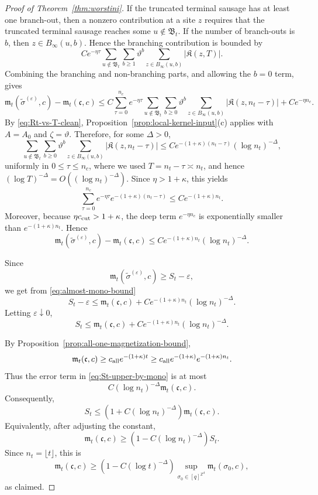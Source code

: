 \documentclass[letterpaper,11pt,reqno]{amsart}
\theoremstyle{definition}
\newcommand{\IK}{\mathfrak{K}}
\begin{document}
\begin{proof}[Proof of Theorem~\ref{thm:worstini}]
If the truncated terminal sausage has at least one branch-out, then a nonzero contribution at a
site \(z\) requires that the truncated terminal sausage reaches some
\(u\notin\mathfrak B_t\). If the number of branch-outs is \(b\), then
\(z\in B_\infty(u,b)\). Hence the branching contribution is bounded by
\[
C e^{-\eta\tau}
\sum_{u\notin\mathfrak B_t}
\sum_{b\ge1}\vartheta^b
\sum_{z\in B_\infty(u,b)}|\IK(z,T)|.
\]
Combining the branching and non-branching parts, and allowing the \(b=0\) term, gives
\[
\mathfrak m_t(\widetilde\sigma^{(\varepsilon)},c)
-
\mathfrak m_t(\mathfrak c,c)
\le
C\sum_{\tau=0}^{n_c}e^{-\eta\tau}
\sum_{u\notin\mathfrak B_t}
\sum_{b\ge0}\vartheta^b
\sum_{z\in B_\infty(u,b)}|\IK(z,n_t-\tau)|
+
C e^{-\eta n_c}.
\]
By \eqref{eq:Rt-vs-T-clean}, Proposition~\ref{prop:local-kernel-input}(c) applies with
\(A=A_0\) and \(\zeta=\vartheta\). Therefore, for some \(\Delta>0\),
\[
\sum_{u\notin\mathfrak B_t}
\sum_{b\ge0}\vartheta^b
\sum_{z\in B_\infty(u,b)}|\IK(z,n_t-\tau)|
\le
C e^{-(1+\kappa)(n_t-\tau)}(\log n_t)^{-\Delta},
\]
uniformly in \(0\le\tau\le n_c\), where we used
\(T=n_t-\tau\asymp n_t\), and hence \((\log T)^{-\Delta}=O((\log n_t)^{-\Delta})\).
Since \(\eta>1+\kappa\), this yields
\[
\sum_{\tau=0}^{n_c}e^{-\eta\tau}
e^{-(1+\kappa)(n_t-\tau)}
\le
C e^{-(1+\kappa)n_t}.
\]
Moreover, because \(\eta c_{\rm cut}>1+\kappa\), the deep term
\(e^{-\eta n_c}\) is exponentially smaller than \(e^{-(1+\kappa)n_t}\). Hence
\begin{equation}\label{eq:almost-mono-bound}
\mathfrak m_t(\widetilde\sigma^{(\varepsilon)},c)
-
\mathfrak m_t(\mathfrak c,c)
\le
C e^{-(1+\kappa)n_t}(\log n_t)^{-\Delta}.
\end{equation}

Since
\[
\mathfrak m_t(\widetilde\sigma^{(\varepsilon)},c)\ge S_t-\varepsilon,
\]
we get from \eqref{eq:almost-mono-bound}
\[
S_t-\varepsilon
\le
\mathfrak m_t(\mathfrak c,c)
+
C e^{-(1+\kappa)n_t}(\log n_t)^{-\Delta}.
\]
Letting \(\varepsilon\downarrow0\),
\begin{equation}\label{eq:St-upper-by-mono}
S_t
\le
\mathfrak m_t(\mathfrak c,c)
+
C e^{-(1+\kappa)n_t}(\log n_t)^{-\Delta}.
\end{equation}

By Proposition~\ref{prop:all-one-magnetization-bound},
\[
\mathfrak m_t(\mathfrak c,c)
\ge
c_{\rm all}e^{-(1+\kappa)t}
\ge
c_{\rm all}e^{-(1+\kappa)}e^{-(1+\kappa)n_t}.
\]
Thus the error term in \eqref{eq:St-upper-by-mono} is at most
\[
C(\log n_t)^{-\Delta}\mathfrak m_t(\mathfrak c,c).
\]
Consequently,
\[
S_t
\le
\left(1+C(\log n_t)^{-\Delta}\right)\mathfrak m_t(\mathfrak c,c).
\]
Equivalently, after adjusting the constant,
\[
\mathfrak m_t(\mathfrak c,c)
\ge
\left(1-C(\log n_t)^{-\Delta}\right)S_t.
\]
Since \(n_t=\lfloor t\rfloor\), this is
\[
\mathfrak m_t(\mathfrak c,c)
\ge
\left(1-C(\log t)^{-\Delta}\right)
\sup_{\sigma_0\in[q]^{\mathbb Z^d}}\mathfrak m_t(\sigma_0,c),
\]
as claimed.
\end{proof}
\end{document}
